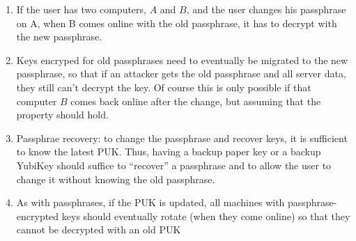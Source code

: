 \begin{enumerate}

\item If the user has two computers, $A$ and $B$, and the user changes his passphrase on A, when B comes online
 with the old passphrase, it has to decrypt with the new passphrase.

\item Keys encryped for old passphrases need to eventually be migrated to the new passphrase, so that if
an attacker gets the old passphrase and all server data, they still can't decrypt the key.  Of course
this is only possible if that computer $B$ comes back online after the change, but assuming that
the property should hold.

\item Passphrae recovery: to change the passphrase and recover keys, it is sufficient to know the latest PUK.
 Thus, having a backup paper key or a backup YubiKey should suffice to ``recover'' a passphrase
 and to allow the user to change it without knowing the old passphrase.

\item As with passphrases, if the PUK is updated, all machines with passphrase-encrypted keys
  should eventually rotate (when they come online) so that they cannot be decrypted with an old PUK
\end{enumerate}

\label{sec:passphrase}

\newcommand{\secretBox}[2]{\textsf{secretBox}(#1, #2)}
\newcommand{\dhbox}[3]{\textsf{dhBox}(#1, #2, #3)}
\newcommand{\pk}[1]{\textsf{publicKey}(#1)}
\newcommand{\sk}[1]{\textsf{secretKey}(#1)}

